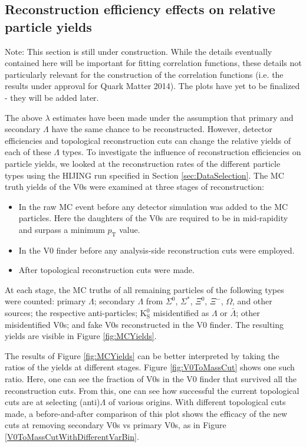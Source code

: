 \subsection{Reconstruction efficiency effects on relative particle yields}
\label{sec:ReconstructionEff}

Note: This section is still under construction.  While the details eventually contained here will be important for fitting correlation functions, these details not particularly relevant for the construction of the correlation functions (i.e. the results under approval for Quark Matter 2014).  The plots have yet to be finalized - they will be added later.

The above $\lambda$ estimates have been made under the assumption that primary and secondary $\Lambda$ have the same chance to be reconstructed.  However, detector efficiencies and topological reconstruction cuts can change the relative yields of each of these $\Lambda$ types.  To investigate the influence of reconstruction efficiencies on particle yields, we looked at the reconstruction rates of the different particle types using the HIJING run specified in Section \ref{sec:DataSelection}.  The MC truth yields of the V0s were examined at three stages of reconstruction:
\begin{itemize}
\item In the raw MC event before any detector simulation was added to the MC particles.  Here the daughters of the V0s are required to be in mid-rapidity and surpass a minimum $p_\mathrm{T}$ value.
\item In the V0 finder before any analysis-side reconstruction cuts were employed.
\item After topological reconstruction cuts were made.
\end{itemize}
At each stage, the MC truths of all remaining particles of the following types were counted: primary $\Lambda$; secondary $\Lambda$ from $\Sigma^0$, $\Sigma^*$, $\Xi^0$, $\Xi^-$, $\Omega$, and other sources; the respective anti-particles; $\mathrm{K}^0_{\mathrm{S}}$ misidentified as $\Lambda$ or $\bar{\Lambda}$; other misidentified V0s; and fake V0s reconstructed in the V0 finder.  The resulting yields are visible in Figure \ref{fig:MCYields}.

The results of Figure \ref{fig:MCYields} can be better interpreted by taking the ratios of the yields at different stages.  Figure \ref{fig:V0ToMassCut} shows one such ratio.  Here, one can see the fraction of V0s in the V0 finder that survived all the reconstruction cuts.  From this, one can see how successful the current topological cuts are at selecting (anti)$\Lambda$ of various origins.  With different topological cuts made, a before-and-after comparison of this plot shows the efficacy of the new cuts at removing secondary V0s vs primary V0s, as in Figure \ref{V0ToMassCutWithDifferentVarBin}.

